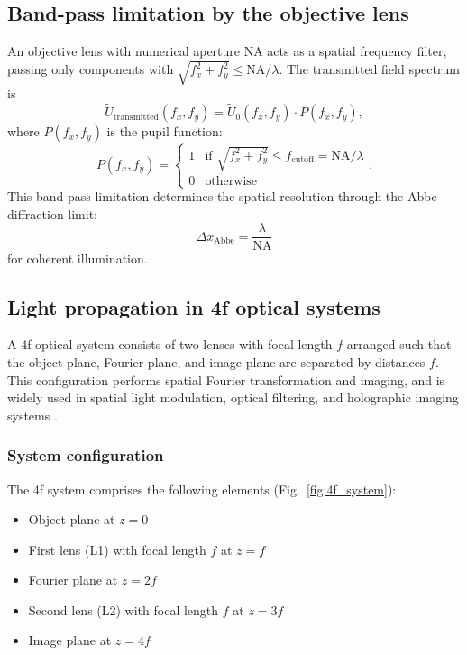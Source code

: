 \subsection{Band-pass limitation by the objective lens}

An objective lens with numerical aperture NA acts as a spatial frequency filter, passing only components with $\sqrt{f_x^2 + f_y^2} \leq \mathrm{NA}/\lambda$. The transmitted field spectrum is
\begin{equation}
\tilde{U}_{\mathrm{transmitted}}(f_x, f_y) = \tilde{U}_0(f_x, f_y) \cdot P(f_x, f_y),
\end{equation}
where $P(f_x, f_y)$ is the pupil function:
\begin{equation}
P(f_x, f_y) = \begin{cases}
1 & \text{if } \sqrt{f_x^2 + f_y^2} \leq f_{\mathrm{cutoff}} = \mathrm{NA}/\lambda \\
0 & \text{otherwise}
\end{cases}.
\end{equation}
This band-pass limitation determines the spatial resolution through the Abbe diffraction limit:
\begin{equation}
\Delta x_{\mathrm{Abbe}} = \frac{\lambda}{\mathrm{NA}}
\end{equation}
for coherent illumination.

\subsection{Light propagation in 4f optical systems}

A 4f optical system consists of two lenses with focal length $f$ arranged such that the object plane, Fourier plane, and image plane are separated by distances $f$. This configuration performs spatial Fourier transformation and imaging, and is widely used in spatial light modulation, optical filtering, and holographic imaging systems \cite{goodman2005}.

\subsubsection{System configuration}

The 4f system comprises the following elements (Fig.~\ref{fig:4f_system}):
\begin{itemize}
\item Object plane at $z = 0$
\item First lens (L1) with focal length $f$ at $z = f$
\item Fourier plane at $z = 2f$
\item Second lens (L2) with focal length $f$ at $z = 3f$
\item Image plane at $z = 4f$
\end{itemize}

